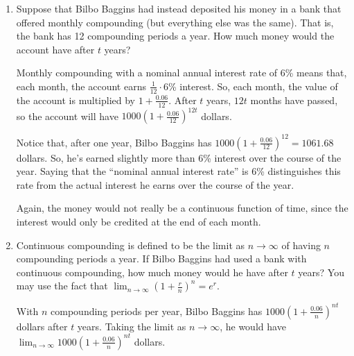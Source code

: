 \documentclass[main]{subfiles}
\begin{document}
\begin{enumerate}
\begin{enumerate}
 \item  \label{moneybags-compound-monthly}


   \begin{problem}[1in]
     Suppose that Bilbo Baggins had instead deposited his money in a bank
     that offered monthly compounding (but everything else was the same).
     That is, the bank has 12 compounding periods a year.  How much money
     would the account have after $t$ years?
   \end{problem}

   \begin{solution}
     Monthly compounding with a nominal annual interest rate of 6\% means
     that, each month, the account earns $\frac{1}{12} \cdot 6$\%
     interest.  So, each month, the value of the account is multiplied by
    $1 + \frac{0.06}{12}$.  After $t$ years, $12t$ months have passed, so
     the account will have $\boxed{1000 \left( 1 + \frac{0.06}{12}
       \right)^{12t}}$ dollars.

     Notice that, after one year, Bilbo Baggins has $1000 \left(1 +
       \frac{0.06}{12} \right)^{12} = 1061.68$ dollars.  So, he's earned
     slightly more than 6\% interest over the course of the year.  Saying
     that the ``nominal annual interest rate'' is 6\% distinguishes this
     rate from the actual interest he earns over the course of the year.

     Again, the money would not really be a continuous function of time,
     since the interest would only be credited at the end of each month. 
   \end{solution}

 \item  \label{moneybags-compound-continuously} 
   \begin{problem}[1in]
     Continuous compounding is defined to be the limit as $n \to \infty$ of
     having $n$ compounding periods a year.  If Bilbo Baggins had used a
     bank with continuous compounding, how much money would he have after
     $t$ years? You may use the fact that $\displaystyle \lim_{n \to \infty} \left( 1 + \frac{r}{n} \right)^n = e^r$.
   \end{problem}

   \begin{solution}
     With $n$ compounding periods per year, Bilbo Baggins has $1000 \left(1
       + \frac{0.06}{n} \right)^{nt}$ dollars after $t$ years.  Taking the
     limit as $n \to \infty$, he would have $\boxed{\displaystyle \lim_{n \to
       \infty} 1000 \left(1 + \frac{0.06}{n} \right)^{nt}}$ dollars.  
      

\end{solution}
\end{enumerate}
\end{enumerate}
\end{document}
